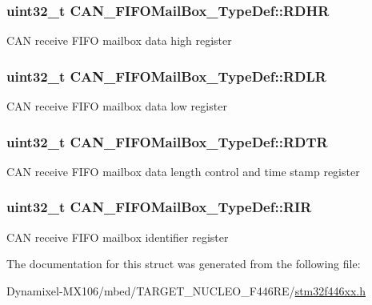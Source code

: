 \subsubsection[{\texorpdfstring{R\+D\+HR}{RDHR}}]{ uint32\+\_\+t C\+A\+N\+\_\+\+F\+I\+F\+O\+Mail\+Box\+\_\+\+Type\+Def\+::\+R\+D\+HR}\hypertarget{struct_c_a_n___f_i_f_o_mail_box___type_def_a95890984bd67845015d40e82fb091c93}{}\label{struct_c_a_n___f_i_f_o_mail_box___type_def_a95890984bd67845015d40e82fb091c93}
C\+AN receive F\+I\+FO mailbox data high register 
\subsubsection[{\texorpdfstring{R\+D\+LR}{RDLR}}]{ uint32\+\_\+t C\+A\+N\+\_\+\+F\+I\+F\+O\+Mail\+Box\+\_\+\+Type\+Def\+::\+R\+D\+LR}\hypertarget{struct_c_a_n___f_i_f_o_mail_box___type_def_ac7d62861de29d0b4fcf11fabbdbd76e7}{}\label{struct_c_a_n___f_i_f_o_mail_box___type_def_ac7d62861de29d0b4fcf11fabbdbd76e7}
C\+AN receive F\+I\+FO mailbox data low register 
\subsubsection[{\texorpdfstring{R\+D\+TR}{RDTR}}]{ uint32\+\_\+t C\+A\+N\+\_\+\+F\+I\+F\+O\+Mail\+Box\+\_\+\+Type\+Def\+::\+R\+D\+TR}\hypertarget{struct_c_a_n___f_i_f_o_mail_box___type_def_a49d74ca8b402c2b9596bfcbe4cd051a9}{}\label{struct_c_a_n___f_i_f_o_mail_box___type_def_a49d74ca8b402c2b9596bfcbe4cd051a9}
C\+AN receive F\+I\+FO mailbox data length control and time stamp register 
\subsubsection[{\texorpdfstring{R\+IR}{RIR}}]{ uint32\+\_\+t C\+A\+N\+\_\+\+F\+I\+F\+O\+Mail\+Box\+\_\+\+Type\+Def\+::\+R\+IR}\hypertarget{struct_c_a_n___f_i_f_o_mail_box___type_def_a034504d43f7b16b320745a25b3a8f12d}{}\label{struct_c_a_n___f_i_f_o_mail_box___type_def_a034504d43f7b16b320745a25b3a8f12d}
C\+AN receive F\+I\+FO mailbox identifier register 

The documentation for this struct was generated from the following file\+:\begin{DoxyCompactItemize}
\item 
Dynamixel-\/\+M\+X106/mbed/\+T\+A\+R\+G\+E\+T\+\_\+\+N\+U\+C\+L\+E\+O\+\_\+\+F446\+R\+E/\hyperlink{stm32f446xx_8h}{stm32f446xx.\+h}\end{DoxyCompactItemize}
